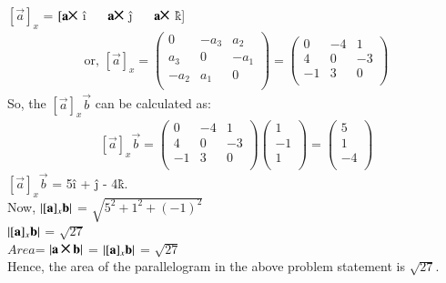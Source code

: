 $[\vec{a}]_x$ = $ [\vec{a} \Cross $  \^i $\quad$  $\vec{a} \Cross $ \^j $\quad$ $\vec{a} \Cross $ \^k] 
\begin{equation}
\begin{aligned}
       \text{or, }[\vec{a}]_x = \begin{pmatrix}
      0       & -a_3    & a_2 \\ 
      a_3       & 0    & -a_1 \\
      -a_2       & a_1     & 0 \\
      
    \end{pmatrix}= \begin{pmatrix}
      0       & -4    & 1 \\ 
      4       & 0    & -3 \\
      -1       & 3     & 0 \\
      
    \end{pmatrix}
\end{aligned}
\end{equation}
So, the $[\vec{a}]_x \vec{b}$ can be calculated as:\\
\begin{equation}
\begin{aligned}
      [\vec{a}]_x \vec{b} = \begin{pmatrix}
      0       & -4    & 1 \\ 
      4       & 0    & -3 \\
      -1       & 3     & 0 \\
      
    \end{pmatrix} \begin{pmatrix}
      1\\ 
      -1\\
      1\\
      
    \end{pmatrix} = \begin{pmatrix}
      5\\ 
      1\\
      -4\\
      
    \end{pmatrix} 
\end{aligned}
\end{equation}
 $[\vec{a}]_x \vec{b}$ = 5\^i + \^j - 4\^k.\\
Now, $\left\vert[\mathbf{a}]_x \mathbf{b}\right\vert $ = $\sqrt{5^2 + 1^2 + (-1)^2}$\\
 $\left\vert[\mathbf{a}]_x \mathbf{b}\right\vert $ = $\sqrt{27}$\\
 $Area$= $\abs{\vec{a} \Cross \vec{b}} $ = $\left\vert[\mathbf{a}]_x \mathbf{b}\right\vert $ = $\sqrt{27}$\\
Hence, the area of the parallelogram in the above problem statement is $\sqrt{27}$.\\